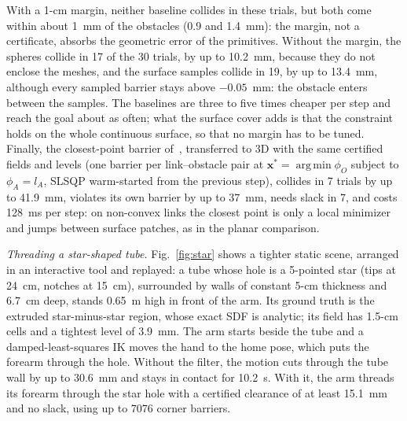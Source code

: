 \documentclass[journal]{IEEEtran}
\theoremstyle{definition}
\DeclareMathOperator*{\argmin}{arg\,min}
\begin{document}
With a 1-cm margin, neither baseline collides in these trials, but both come within about 1~mm of
the obstacles (0.9 and 1.4~mm): the margin, not a certificate, absorbs the geometric error of the
primitives. Without the margin, the spheres collide in 17 of the 30 trials, by up to 10.2~mm,
because they do not enclose the meshes, and the surface samples collide in 19, by up to 13.4~mm,
although every sampled barrier stays above $-0.05$~mm: the obstacle enters between the samples. The baselines are
three to five times cheaper per step and reach the goal about as often; what the surface cover adds
is that the constraint holds on the whole continuous surface, so that no margin has to be tuned.
Finally, the closest-point barrier of~\cite{jo2026geometry}, transferred to 3D with the same
certified fields and levels (one barrier per link--obstacle pair at
$\mathbf x^\ast=\argmin\phi_O$ subject to $\phi_A=l_A$, SLSQP warm-started from the previous step),
collides in 7 trials by up to 41.9~mm, violates its own barrier by up to 37~mm, needs slack in 7, and
costs 128~ms per step:
on non-convex links the closest point is only a local minimizer and jumps between surface patches,
as in the planar comparison.

\emph{Threading a star-shaped tube.} Fig.~\ref{fig:star} shows a tighter static scene, arranged in an
interactive tool and replayed: a tube whose hole is a 5-pointed star (tips at 24~cm, notches at
15~cm), surrounded by walls of constant 5-cm thickness and 6.7~cm deep, stands 0.65~m high in front of
the arm. Its ground truth is the extruded star-minus-star region, whose exact SDF is analytic; its
field has 1.5-cm cells and a tightest level of 3.9~mm. The arm starts beside the tube and a
damped-least-squares IK moves the hand to the home pose, which puts the forearm through the hole.
Without the filter, the motion cuts through the tube wall by up to 30.6~mm and stays in contact for
10.2~s. With it, the arm threads its forearm through the star hole with a certified clearance of at
least 15.1~mm and no slack, using up to 7076 corner barriers.
\end{document}
